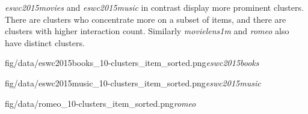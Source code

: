 \textit{eswc2015movies} and \textit{eswc2015music} in contrast display more prominent clusters. There are clusters who concentrate more on a subset of items, and there are clusters with higher interaction count.  Similarly \textit{movielens1m} and \textit{romeo} also have distinct clusters.



\FloatBarrier

{fig/data/eswc2015books_10-clusters_item_sorted.png}{\textit{eswc2015books}}

{fig/data/eswc2015music_10-clusters_item_sorted.png}{\textit{eswc2015music}}

{fig/data/romeo_10-clusters_item_sorted.png}{\textit{romeo}}

\FloatBarrier

